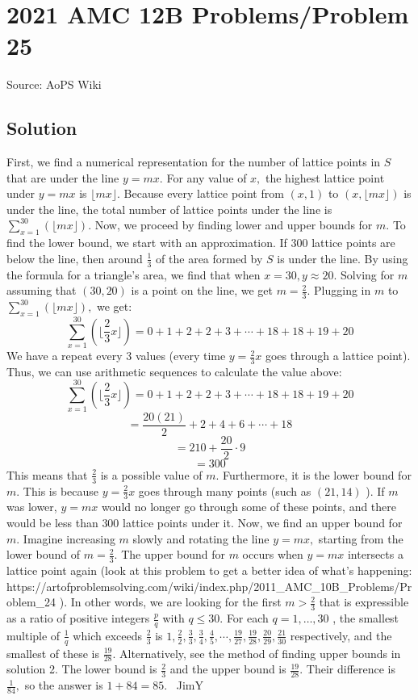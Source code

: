 \documentclass[12pt]{article}
\begin{document}
\section*{{2021 AMC 12B Problems/Problem 25}}
Source: AoPS Wiki

\subsection*{Solution}
First, we find a numerical representation for the number of lattice points in $S$ that are under the line $y=mx.$ For any value of $x,$ the highest lattice point under $y=mx$ is $\lfloor mx \rfloor.$ Because every lattice point from $(x, 1)$ to $(x, \lfloor mx \rfloor)$ is under the line, the total number of lattice points under the line is $\sum_{x=1}^{30}(\lfloor mx \rfloor).$ Now, we proceed by finding lower and upper bounds for $m.$ To find the lower bound, we start with an approximation. If $300$ lattice points are below the line, then around $\frac{1}{3}$ of the area formed by $S$ is under the line. By using the formula for a triangle's area, we find that when $x=30, y \approx 20.$ Solving for $m$ assuming that $(30, 20)$ is a point on the line, we get $m = \frac{2}{3}.$ Plugging in $m$ to $\sum_{x=1}^{30}(\lfloor mx \rfloor),$ we get: \[\sum_{x=1}^{30}(\lfloor \frac{2}{3}x \rfloor) = 0 + 1 + 2 + 2 + 3 + \cdots + 18 + 18 + 19 + 20\] We have a repeat every $3$ values (every time $y=\frac{2}{3}x$ goes through a lattice point). Thus, we can use arithmetic sequences to calculate the value above: \[\sum_{x=1}^{30}(\lfloor \frac{2}{3}x \rfloor) = 0 + 1 + 2 + 2 + 3 + \cdots + 18 + 18 + 19 + 20\] \[=\frac{20(21)}{2} + 2 + 4 + 6 + \cdots + 18\] \[=210 + \frac{20}{2}\cdot 9\] \[=300\] This means that $\frac{2}{3}$ is a possible value of $m.$ Furthermore, it is the lower bound for $m.$ This is because $y=\frac{2}{3}x$ goes through many points (such as $(21, 14)$ ). If $m$ was lower, $y=mx$ would no longer go through some of these points, and there would be less than $300$ lattice points under it. Now, we find an upper bound for $m.$ Imagine increasing $m$ slowly and rotating the line $y=mx,$ starting from the lower bound of $m=\frac{2}{3}.$ The upper bound for $m$ occurs when $y=mx$ intersects a lattice point again (look at this problem to get a better idea of what's happening: https://artofproblemsolving.com/wiki/index.php/2011_AMC_10B_Problems/Problem_24 ). In other words, we are looking for the first $m > \frac{2}{3}$ that is expressible as a ratio of positive integers $\frac{p}{q}$ with $q \le 30.$ For each $q=1,\dots,30$ , the smallest multiple of $\frac{1}{q}$ which exceeds $\frac{2}{3}$ is $1, \frac{2}{2}, \frac{3}{3}, \frac{3}{4}, \frac{4}{5}, \cdots , \frac{19}{27}, \frac{19}{28}, \frac{20}{29}, \frac{21}{30}$ respectively, and the smallest of these is $\frac{19}{28}.$ Alternatively, see the method of finding upper bounds in solution 2. The lower bound is $\frac{2}{3}$ and the upper bound is $\frac{19}{28}.$ Their difference is $\frac{1}{84},$ so the answer is $1 + 84 = \boxed{85}.$ ~JimY
\end{document}
